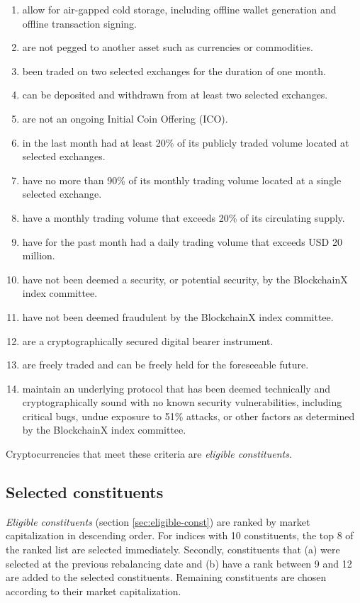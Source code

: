\documentclass{article}
\begin{document}
\begin{enumerate}
\def\labelenumi{\arabic{enumi}.}
\item
  allow for air-gapped cold storage, including offline wallet generation
  and offline transaction signing.
\item
  are not pegged to another asset such as currencies or commodities.
\item
  been traded on two selected exchanges for the duration of one month.
\item
  can be deposited and withdrawn from at least two selected exchanges.
\item
  are not an ongoing Initial Coin Offering (ICO).
\item
  in the last month had at least 20\% of its publicly traded volume
  located at selected exchanges.
\item
  have no more than 90\% of its monthly trading volume located at a
  single selected exchange.
\item
  have a monthly trading volume that exceeds 20\% of its circulating
  supply.
\item
  have for the past month had a daily trading volume that exceeds USD 20
  million.
\item
  have not been deemed a security, or potential security, by the
  BlockchainX index committee.
\item
  have not been deemed fraudulent by the BlockchainX index committee.
\item
  are a cryptographically secured digital bearer instrument.
\item
  are freely traded and can be freely held for the foreseeable future.
\item
  maintain an underlying protocol that has been deemed technically and
  cryptographically sound with no known security vulnerabilities,
  including critical bugs, undue exposure to 51\% attacks, or other
  factors as determined by the BlockchainX index committee.
\end{enumerate}

Cryptocurrencies that meet these criteria are \emph{eligible
constituents}.

\subsection{Selected constituents}\label{selected-constituents}

\emph{Eligible constituents} (section \ref{sec:eligible-const}) are
ranked by market capitalization in descending order. For indices with 10
constituents, the top 8 of the ranked list are selected immediately.
Secondly, constituents that (a) were selected at the previous
rebalancing date and (b) have a rank between 9 and 12 are added to the
selected constituents. Remaining constituents are chosen according to
their market capitalization.
\end{document}
